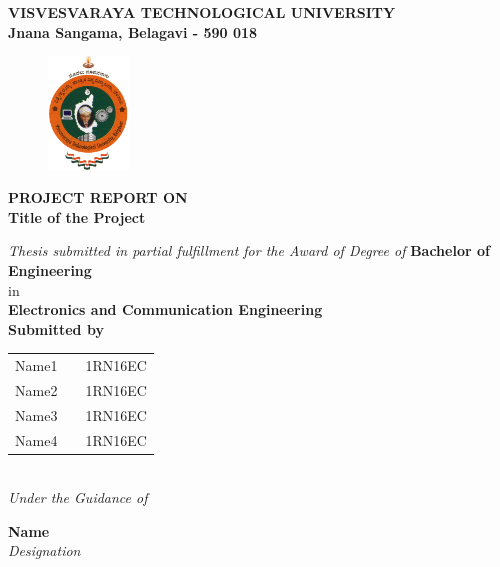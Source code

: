 
\begin{titlingpage}
\thispagestyle{empty}\centering

\setlength{\toptafiddle}{1in}
\setlength{\bottafiddle}{1in}
\vspace*{-0.75in}
\enlargethispage{\toptafiddle}
\large 
\textbf{VISVESVARAYA TECHNOLOGICAL UNIVERSITY\\
	Jnana Sangama, Belagavi - 590 018}\\
\vspace{0.2cm}
\begin{figure}[h]
\centering
\includegraphics[height=3cm]{images/vtu.png}
\end{figure}
\small{\textbf{PROJECT REPORT ON}}\\

\LARGE{\textbf{\color{red}Title of the Project}}
\vspace{0.5cm}

\large \textit{Thesis submitted in partial fulfillment for the Award of Degree of }{\textbf{Bachelor of Engineering}}\\
in \\\textbf{Electronics and Communication Engineering}
\vspace{0.5cm}\\
{\textbf{Submitted by\\}}

\begin{tabular}{lll}

Name1 & \hspace{5cm}  &1RN16EC\\
Name2 &   &1RN16EC\\
Name3 &   &1RN16EC\\
Name4 &   &1RN16EC\\

\end{tabular}
\vspace{0.5cm}\\
\textit{Under the Guidance of}


\Large{\textbf{Name}}\\
\textit{Designation}\\


\end{titlingpage}
